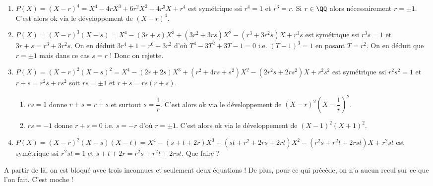 \documentclass[12pt]{amsart}
\begin{document}
\begin{enumerate}
	\item $P(X) = (X - r)^4
	            = X^4
	            - 4 r X^3
	            + 6 r^2 X^2
	            - 4 r^3 X
	            + r^4$
	       est symétrique
	       ssi
	       $r^4 = 1$ et $r^3 = r$.
	       Si $r\in \QQ$ alors nécessairement $r = \pm 1$.
	       C'est alors ok via le développement de $(X - r)^4$.

	\item $P(X) = (X - r)^3 (X - s)
	            = X^4
	            - (3 r + s) X^3
	            + (3 r^2 + 3 r s) X^2
	            - (r^3 + 3 r^2 s) X
	            + r^3 s$
	       est symétrique
	       ssi
	       $r^3 s = 1$ et $3 r + s = r^3 + 3 r^2 s$.
	       On en déduit $3 r^4 + 1 = r^6 + 3 r^2$
	       d'où $T^3 - 3 T^2 + 3 T - 1 = 0$
	       i.e. $(T - 1)^3 = 1$
	       en posant $T = r^2$.
	       On en déduit que $r = \pm 1$ mais dans ce cas $s = r$ !
	       Donc on rejette. 

	\item $P(X) = (X - r)^2 (X - s)^2
	            = X^4
	            - (2 r  + 2 s) X^3
	            + (r^2 + 4 r s + s^2) X^2
	            - (2 r^2 s + 2 r s^2) X
	            + r^2 s^2
	            $
	       est symétrique
	       ssi
	       $r^2 s^2 = 1$ et $r + s = r^2 s + r s^2$ soit
	       $r s = \pm 1$ et $r + s = rs(r + s)$.
	       
	\begin{enumerate}
		\item $r s = 1$ donne $r  + s = r + s$ et surtout $s = \dfrac1r$.
		C'est alors ok via le développement de $(X - r)^2 \left( X - \dfrac1r \right)^2$.

		\item $r s = -1$ donne $r  + s = 0$ i.e. $s = - r$ d'où $r = \pm 1$.
		C'est alors ok via le développement de $(X - 1)^2 ( X + 1)^2$.
	\end{enumerate}
	
	\item $P(X) = (X - r)^2 (X - s) (X - t)
	            = X^4
	            - (s + t + 2 r) X^3
	            + (s t + r^2 + 2 r s + 2 r t) X^2
	            - (r^2 s + r^2 t + 2 r s t) X 
	            + r^2 s t$
	       est symétrique
	       ssi
	       $r^2 s t = 1$ et $s + t + 2 r = r^2 s + r^2 t + 2 r s t$. Que faire ?
\end{enumerate}

A partir de là, on est bloqué avec trois inconnues et seulement deux équations ! De plus, pour ce qui précède, on n'a aucun recul sur ce que l'on fait. C'est moche !
\end{document}
